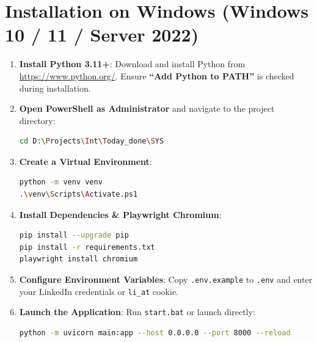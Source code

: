 \documentclass[11pt,a4paper]{report}
\begin{document}
\section{Installation on Windows (Windows 10 / 11 / Server 2022)}
\begin{enumerate}[leftmargin=*]
    \item \textbf{Install Python 3.11+}: Download and install Python from \url{https://www.python.org/}. Ensure \textbf{``Add Python to PATH''} is checked during installation.
    \item \textbf{Open PowerShell as Administrator} and navigate to the project directory:
\begin{lstlisting}[language=bash]
cd D:\Projects\Int\Today_done\SYS
\end{lstlisting}
    \item \textbf{Create a Virtual Environment}:
\begin{lstlisting}[language=bash]
python -m venv venv
.\venv\Scripts\Activate.ps1
\end{lstlisting}
    \item \textbf{Install Dependencies \& Playwright Chromium}:
\begin{lstlisting}[language=bash]
pip install --upgrade pip
pip install -r requirements.txt
playwright install chromium
\end{lstlisting}
    \item \textbf{Configure Environment Variables}: Copy \texttt{.env.example} to \texttt{.env} and enter your LinkedIn credentials or \texttt{li\_at} cookie.
    \item \textbf{Launch the Application}: Run \texttt{start.bat} or launch directly:
\begin{lstlisting}[language=bash]
python -m uvicorn main:app --host 0.0.0.0 --port 8000 --reload
\end{lstlisting}
\end{enumerate}
\end{document}
